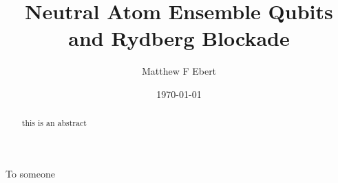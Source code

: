 
\title{Neutral Atom Ensemble Qubits and Rydberg Blockade}
\author{Matthew F Ebert}
\newcommand{\oraldate}{1/31/2017}%
\newcommand{\profA}{Iam A. Professor, Professor, Geography}
\newcommand{\profB}{Iam A. Professor, Professor, Geography}
\newcommand{\profC}{Iam A. Professor, Professor, Geography}
\newcommand{\profD}{Iam A. Professor, Professor, Geography}
\newcommand{\profE}{Iam A. Professor, Professor, Geography}
\date{\today{}}

\maketitle

\begin{dedication}
  To someone
\end{dedication}

\begin{abstract}
  this is an abstract
\end{abstract}

\tableofcontents


